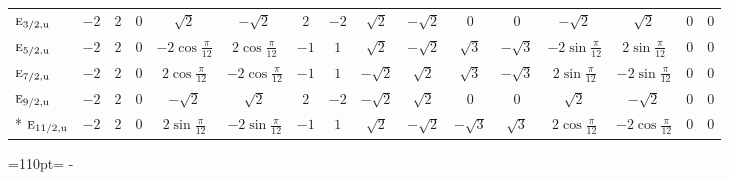\documentclass[10pt,a4paper]{article}
\newcommand{\needspace}[1]{\par\penalty-100\begingroup\dimen0=#1\relax\dimen2=\pagegoal
  \advance\dimen2-\pagetotal\ifdim\dimen0>\dimen2\relax\ifdim\dimen2>0pt\vfil\break\fi\fi
  \endgroup}
\numberwithin{equation}{section}
\newcommand{\irr}[1]{\text{\normalfont\scshape #1}}
\newcommand{\ptag}[1]{\mathrm{#1}}
\begin{document}
{{\begin{longtable}{@{}lccccccccccccccc@{}}
$\irr{e}_{3/2,\ptag{u}}$ & $-2$ & $2$ & $0$ & $\sqrt{2}$ & $-\sqrt{2}$ & $2$ & $-2$ & $\sqrt{2}$ & $-\sqrt{2}$ & $0$ & $0$ & $-\sqrt{2}$ & $\sqrt{2}$ & $0$ & $0$\\
$\irr{e}_{5/2,\ptag{u}}$ & $-2$ & $2$ & $0$ & $-2\cos\tfrac{\pi}{12}$ & $2\cos\tfrac{\pi}{12}$ & $-1$ & $1$ & $\sqrt{2}$ & $-\sqrt{2}$ & $\sqrt{3}$ & $-\sqrt{3}$ & $-2\sin\tfrac{\pi}{12}$ & $2\sin\tfrac{\pi}{12}$ & $0$ & $0$\\
$\irr{e}_{7/2,\ptag{u}}$ & $-2$ & $2$ & $0$ & $2\cos\tfrac{\pi}{12}$ & $-2\cos\tfrac{\pi}{12}$ & $-1$ & $1$ & $-\sqrt{2}$ & $\sqrt{2}$ & $\sqrt{3}$ & $-\sqrt{3}$ & $2\sin\tfrac{\pi}{12}$ & $-2\sin\tfrac{\pi}{12}$ & $0$ & $0$\\
$\irr{e}_{9/2,\ptag{u}}$ & $-2$ & $2$ & $0$ & $-\sqrt{2}$ & $\sqrt{2}$ & $2$ & $-2$ & $-\sqrt{2}$ & $\sqrt{2}$ & $0$ & $0$ & $\sqrt{2}$ & $-\sqrt{2}$ & $0$ & $0$\\*
$\irr{e}_{11/2,\ptag{u}}$ & $-2$ & $2$ & $0$ & $2\sin\tfrac{\pi}{12}$ & $-2\sin\tfrac{\pi}{12}$ & $-1$ & $1$ & $\sqrt{2}$ & $-\sqrt{2}$ & $-\sqrt{3}$ & $\sqrt{3}$ & $2\cos\tfrac{\pi}{12}$ & $-2\cos\tfrac{\pi}{12}$ & $0$ & $0$\\
\bottomrule\end{longtable}}}
\needspace{110pt}
\end{document}
